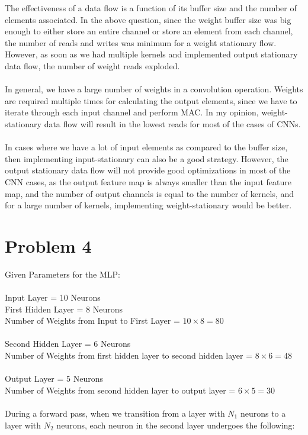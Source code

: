 \documentclass{article}
\begin{document}
The effectiveness of a data flow is a function of its buffer size and the number of elements associated. In the above question, since the weight buffer size was big enough to either store an entire channel or store an element from each channel, the number of reads and writes was minimum for a weight stationary flow. However, as soon as we had multiple kernels and implemented output stationary data flow, the number of weight reads exploded.\\
\\
In general, we have a large number of weights in a convolution operation. Weights are required multiple times for calculating the output elements, since we have to iterate through each input channel and perform MAC. In my opinion, weight-stationary data flow will result in the lowest reads for most of the cases of CNNs.\\
\\
In cases where we have a lot of input elements as compared to the buffer size, then implementing input-stationary can also be a good strategy. However, the output stationary data flow will not provide good optimizations in most of the CNN cases, as the output feature map is always smaller than the input feature map, and the number of output channels is equal to the number of kernels, and for a large number of kernels, implementing weight-stationary would be better.

\section{Problem 4}

Given Parameters for the MLP:\\
\\
Input Layer = 10 Neurons\\
First Hidden Layer = 8 Neurons\\
Number of Weights from Input to First Layer = $10 \times 8 = 80$\\
\\
Second Hidden Layer = 6 Neurons\\
Number of Weights from first hidden layer to second hidden layer = $8 \times 6 = 48$\\
\\
Output Layer = 5 Neurons\\
Number of Weights from second hidden layer to output layer = $6 \times 5 = 30$\\
\\
During a forward pass, when we transition from a layer with $N_1$ neurons to a layer with $N_2$ neurons, each neuron in the second layer undergoes the following:
\end{document}
